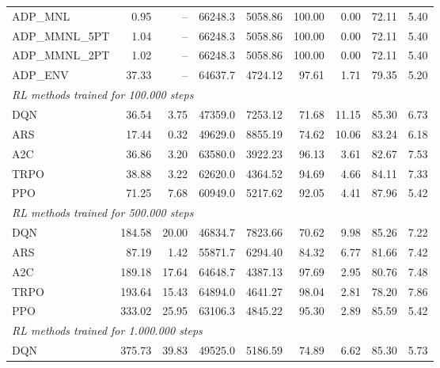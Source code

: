 \begin{samepage}
\begin{center}
\begin{tabular}{l|rr|rr|rr|rr}
    \midrule
    ADP\_MNL     &     0.95 &    -- &    66248.3 &    5058.86 &  100.00 &    0.00 &   72.11 &    5.40 \\
    ADP\_MMNL\_5PT &     1.04 &    -- &    66248.3 &    5058.86 &  100.00 &    0.00 &   72.11 &    5.40 \\
    ADP\_MMNL\_2PT &     1.02 &    -- &    66248.3 &    5058.86 &  100.00 &    0.00 &   72.11 &    5.40 \\
    ADP\_ENV     &    37.33 &    -- &    64637.7 &    4724.12 &   97.61 &    1.71 &   79.35 &    5.20 \\
    \midrule
    \multicolumn{9}{l}{\textit{RL methods trained for 100.000 steps}} \\
    \midrule
    DQN          &    36.54 &     3.75 &    47359.0 &    7253.12 &   71.68 &   11.15 &   85.30 &    6.73 \\
    ARS          &    17.44 &     0.32 &    49629.0 &    8855.19 &   74.62 &   10.06 &   83.24 &    6.18 \\
    A2C          &    36.86 &     3.20 &    63580.0 &    3922.23 &   96.13 &    3.61 &   82.67 &    7.53 \\
    TRPO         &    38.88 &     3.22 &    62620.0 &    4364.52 &   94.69 &    4.66 &   84.11 &    7.33 \\
    PPO          &    71.25 &     7.68 &    60949.0 &    5217.62 &   92.05 &    4.41 &   87.96 &    5.42 \\
    \midrule
    \multicolumn{9}{l}{\textit{RL methods trained for 500.000 steps}} \\
    \midrule
    DQN          &   184.58 &    20.00 &    46834.7 &    7823.66 &   70.62 &    9.98 &   85.26 &    7.22 \\
    ARS          &    87.19 &     1.42 &    55871.7 &    6294.40 &   84.32 &    6.77 &   81.66 &    7.42 \\
    A2C          &   189.18 &    17.64 &    64648.7 &    4387.13 &   97.69 &    2.95 &   80.76 &    7.48 \\
    TRPO         &   193.64 &    15.43 &    64894.0 &    4641.27 &   98.04 &    2.81 &   78.20 &    7.86 \\
    PPO          &   333.02 &    25.95 &    63106.3 &    4845.22 &   95.30 &    2.89 &   85.59 &    5.42 \\
    \midrule
    \multicolumn{9}{l}{\textit{RL methods trained for 1.000.000 steps}} \\
    \midrule
    DQN          &   375.73 &    39.83 &    49525.0 &    5186.59 &   74.89 &    6.62 &   85.30 &    5.73 \\

\end{tabular}
\end{center}
\end{samepage}
